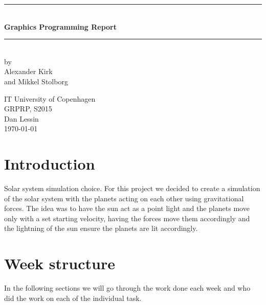 \documentclass[a4paper,11pt]{article}
\begin{document}
\begin{titlepage}

\centering \parindent=0pt
\newcommand{\HRule}{\rule{\textwidth}{1mm}}
 \HRule\\[1cm]\Huge\bfseries
Graphics Programming Report\\[0.7cm]
\HRule\\[4cm]  
\large by 
\\Alexander Kirk
\\ and Mikkel Stolborg
 \normalsize %
\begin{flushleft}
IT University of Copenhagen \\
GRPRP, S2015\\
Dan Lessin\\
\today \end{flushleft}
\end{titlepage}

\tableofcontents
\pagebreak
\section{Introduction}
Solar system simulation choice.
For this project we decided to create a simulation of the solar system with the planets acting on each other using gravitational forces. The idea was to have the sun act as a point light and the planets move only with a set starting velocity, having the forces move them accordingly and the lightning of the sun ensure the planets are lit accordingly.

\section{Week structure}
In the following sections we will go through the work done each week and who did the work on each of the individual task.
\end{document}
